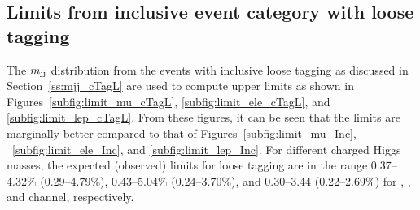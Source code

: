 \subsection{Limits from inclusive event category with loose  tagging}
\label{ss:limit_cTagL}
The $m_\text{jj}$ distribution from the events with inclusive loose \PQc tagging as discussed 
in Section~\ref{ss:mjj_cTagL} are used to compute upper limits as shown in
Figures~\ref{subfig:limit_mu_cTagL}, \ref{subfig:limit_ele_cTagL}, and \ref{subfig:limit_lep_cTagL}. 
From these figures, it can be seen that the limits are marginally better compared to that 
of Figures~\ref{subfig:limit_mu_Inc}, ~\ref{subfig:limit_ele_Inc}, and \ref{subfig:limit_lep_Inc}. 
For different charged Higgs masses, the expected (observed) limits for loose \PQc tagging are in the 
range 0.37--4.32\% (0.29--4.79\%), 0.43--5.04\% (0.24--3.70\%), and 
0.30--3.44 (0.22--2.69\%)
for \mujets, \ejets, and \ljets channel, respectively.

